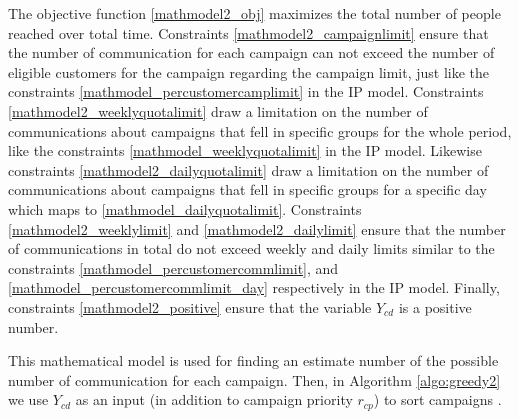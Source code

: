 \documentclass[11pt]{article}
\begin{document}
The objective function \eqref{mathmodel2_obj} maximizes the total number of people reached over total time. Constraints \eqref{mathmodel2_campaignlimit} ensure that the number of communication for each campaign can not exceed the number of eligible customers for the campaign regarding the campaign limit, just like the constraints \eqref{mathmodel_percustomercamplimit} in the IP model. Constraints \eqref{mathmodel2_weeklyquotalimit} draw a limitation on the number of communications about campaigns that fell in specific groups for the whole period, like the constraints \eqref{mathmodel_weeklyquotalimit} in the IP model. Likewise constraints \eqref{mathmodel2_dailyquotalimit} draw a limitation on the number of communications about campaigns that fell in specific groups for a specific day which maps to \eqref{mathmodel_dailyquotalimit}. Constraints \eqref{mathmodel2_weeklylimit} and \eqref{mathmodel2_dailylimit} ensure that the number of communications in total do not exceed weekly and daily limits similar to the constraints \eqref{mathmodel_percustomercommlimit}, and \eqref{mathmodel_percustomercommlimit_day} respectively in the IP model. Finally, constraints \eqref{mathmodel2_positive} ensure that the variable $Y_{{c}{d}}$ is a positive number.

This mathematical model is used for finding an estimate number of the possible number of communication for each campaign. Then, in Algorithm \ref{algo:greedy2} we use $Y_{{c}{d}}$ as an input (in addition to campaign priority $r_{{c}{p}}$) to sort campaigns .
\end{document}
